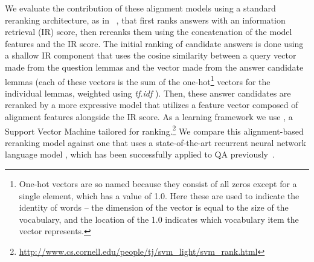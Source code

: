 We evaluate the contribution of these alignment models using a standard reranking architecture, as in ~\citet{jansen14}, that first ranks answers with an information retrieval (IR) score, then rereanks them using the concatenation of the model features and the IR score.
The initial ranking of candidate answers is done using a shallow IR component that uses the cosine similarity between a query vector made from the question lemmas and the vector made from the answer candidate lemmas (each of these vectors is the sum of the one-hot\footnote{One-hot vectors are so named because they consist of all zeros except for a single element, which has a value of 1.0.  Here these are used to indicate the identity of words -- the dimension of the vector is equal to the size of the vocabulary, and the location of the 1.0 indicates which vocabulary item the vector represents.} vectors for the individual lemmas, weighted using {\em tf.idf} \citep[Ch. 6,][]{manning08}).
Then, these answer candidates are reranked by a more expressive model that utilizes a feature vector composed of alignment features alongside the IR score.  As a learning framework we use \svmr , a Support Vector Machine tailored for ranking.\footnote{ \url{http://www.cs.cornell.edu/people/tj/svm_light/svm_rank.html}}
We compare this alignment-based reranking model against one that uses a state-of-the-art recurrent neural network language model \citep{mikolov10,mikolov13}, which has been successfully applied to QA previously~\citep[e.g.,][]{yih13}.


